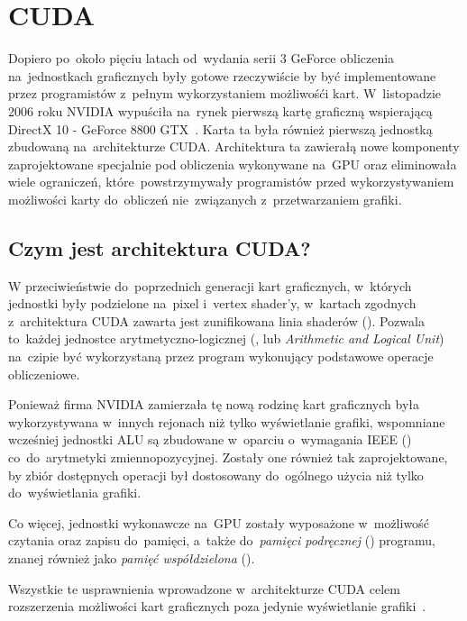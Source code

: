 \section{CUDA}

Dopiero po~około pięciu latach od~wydania serii 3 GeForce obliczenia na~jednostkach graficznych były gotowe rzeczywiście by być implementowane przez programistów z~pełnym wykorzystaniem możliwośći kart. W~listopadzie 2006 roku NVIDIA wypuściła na~rynek pierwszą kartę graficzną wspierającą DirectX 10 - GeForce 8800 GTX~\cite{nvidia:geforce8800}. Karta ta była również pierwszą jednostką zbudowaną na~architekturze CUDA. Architektura ta zawierałą nowe komponenty zaprojektowane specjalnie pod obliczenia wykonywane na~GPU oraz eliminowała wiele ograniczeń, które~powstrzymywały programistów przed wykorzystywaniem możliwości karty do~obliczeń nie~związanych z~przetwarzaniem grafiki.

\subsection{Czym jest architektura CUDA?}

W przeciwieństwie do~poprzednich generacji kart graficznych, w~których jednostki były podzielone na~pixel i~vertex shader'y, w~kartach zgodnych z~architektura CUDA zawarta jest zunifikowana linia shaderów (). Pozwala to~każdej jednostce arytmetyczno-logicznej (,  lub \emph{Arithmetic and Logical Unit}) na~czipie być wykorzystaną przez program wykonujący podstawowe operacje obliczeniowe.

Ponieważ firma NVIDIA zamierzała tę nową rodzinę kart graficznych była wykorzystywana w~innych rejonach niż tylko wyświetlanie grafiki, wspomniane wcześniej jednostki ALU są zbudowane w~oparciu o~wymagania IEEE () co~do~arytmetyki zmiennopozycyjnej. Zostały one również tak zaprojektowane, by zbiór dostępnych operacji był dostosowany do~ogólnego użycia niż tylko do~wyświetlania grafiki. 

Co więcej, jednostki wykonawcze na~GPU zostały wyposażone w~możliwość czytania oraz zapisu do~pamięci, a~także do~\emph{pamięci podręcznej} () programu, znanej również jako \emph{pamięć współdzielona} ().

Wszystkie te usprawnienia wprowadzone w~architekturze CUDA celem rozszerzenia możliwości kart graficznych poza jedynie wyświetlanie grafiki~\cite{Cuda:Example}.

